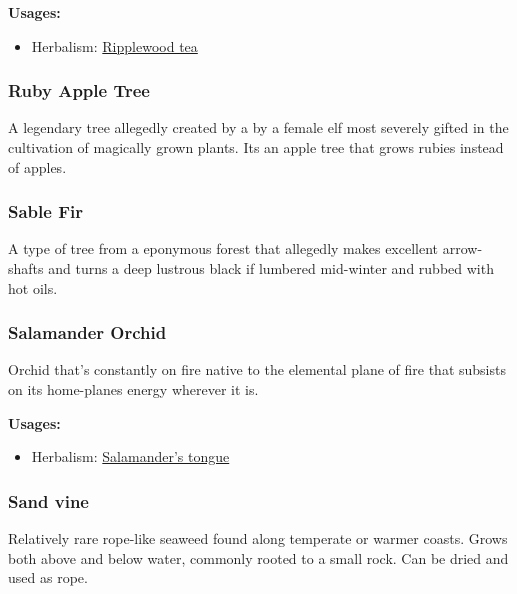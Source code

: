 \vspace{5mm}

\textbf{Usages:}

\begin{itemize}[noitemsep]
\item[] Herbalism: \hyperref[Ripplewood tea]{Ripplewood tea}
\end{itemize}

\subsubsection{Ruby Apple Tree}

A legendary tree allegedly created by a by a female elf most severely gifted in the cultivation of magically grown plants. Its an apple tree that grows rubies instead of apples.

\subsubsection{Sable Fir}

A type of tree from a eponymous forest that allegedly makes excellent arrow-shafts and turns a deep lustrous black if lumbered mid-winter and rubbed with hot oils.

\subsubsection{Salamander Orchid}
\label{Salamander Orchid}

Orchid that's constantly on fire native to the elemental plane of fire that subsists on its home-planes energy wherever it is.

\vspace{5mm}

\textbf{Usages:}

\begin{itemize}[noitemsep]
\item[] Herbalism: \hyperref[Salamander's tongue]{Salamander's tongue}
\end{itemize}

\subsubsection{Sand vine}
\label{Sand vine}

Relatively rare rope-like seaweed found along temperate or warmer coasts. Grows both above and below water, commonly rooted to a small rock. Can be dried and used as rope.

